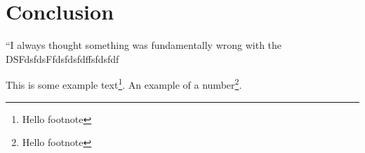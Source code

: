 \documentclass[10pt]{article}
\begin{document}
\section{Conclusion}
``I always thought something was fundamentally wrong with the \\
DSFdsfdsFfdsfdsfdffsfdsfdf



This is some example text\footnote{\label{myfootnote}Hello footnote}.
An example of a number\footnote{\label{myfootnote}Hello footnote}.
\end{document}
